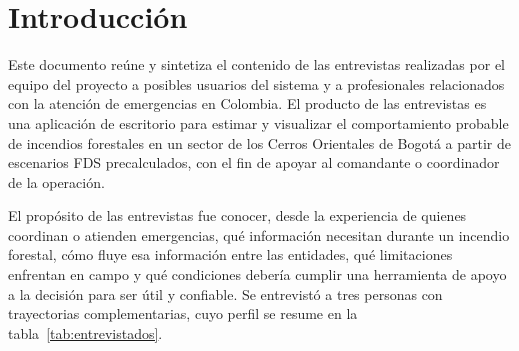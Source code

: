 \begin{titlepage}
\vfill
\begin{flushright}
\fechadocumento
\end{flushright}
\restoregeometry
\end{titlepage}

\setcounter{page}{2}

\tableofcontents

\section{Introducción}

Este documento reúne y sintetiza el contenido de las entrevistas realizadas por el equipo del proyecto a posibles usuarios del sistema y a profesionales relacionados con la atención de emergencias en Colombia. El producto de las entrevistas es una aplicación de escritorio para estimar y visualizar el comportamiento probable de incendios forestales en un sector de los Cerros Orientales de Bogotá a partir de escenarios FDS precalculados, con el fin de apoyar al comandante o coordinador de la operación.

El propósito de las entrevistas fue conocer, desde la experiencia de quienes coordinan o atienden emergencias, qué información necesitan durante un incendio forestal, cómo fluye esa información entre las entidades, qué limitaciones enfrentan en campo y qué condiciones debería cumplir una herramienta de apoyo a la decisión para ser útil y confiable. Se entrevistó a tres personas con trayectorias complementarias, cuyo perfil se resume en la tabla~\ref{tab:entrevistados}.

